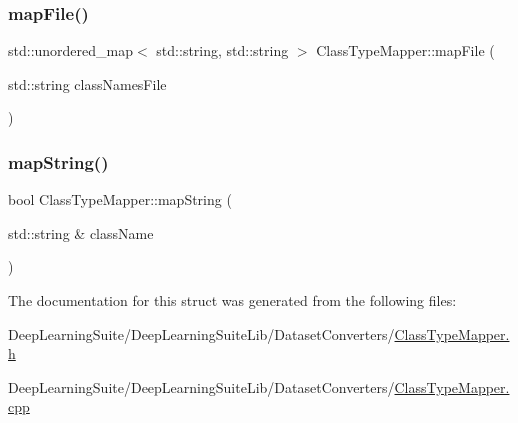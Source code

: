 \mbox{\label{struct_class_type_mapper_afca49a200b7561bf9120a6a0312de119}} 
\subsubsection{\texorpdfstring{map\+File()}{mapFile()}}
{\footnotesize\ttfamily std\+::unordered\+\_\+map$<$ std\+::string, std\+::string $>$ Class\+Type\+Mapper\+::map\+File (\begin{DoxyParamCaption}\item[{std\+::string}]{class\+Names\+File }\end{DoxyParamCaption})}

\mbox{\label{struct_class_type_mapper_af76d00ce9a2267710ee9119f0bb2e607}} 
\subsubsection{\texorpdfstring{map\+String()}{mapString()}}
{\footnotesize\ttfamily bool Class\+Type\+Mapper\+::map\+String (\begin{DoxyParamCaption}\item[{std\+::string \&}]{class\+Name }\end{DoxyParamCaption})}



The documentation for this struct was generated from the following files\+:\begin{DoxyCompactItemize}
\item 
Deep\+Learning\+Suite/\+Deep\+Learning\+Suite\+Lib/\+Dataset\+Converters/\hyperlink{_class_type_mapper_8h}{Class\+Type\+Mapper.\+h}\item 
Deep\+Learning\+Suite/\+Deep\+Learning\+Suite\+Lib/\+Dataset\+Converters/\hyperlink{_class_type_mapper_8cpp}{Class\+Type\+Mapper.\+cpp}\end{DoxyCompactItemize}
